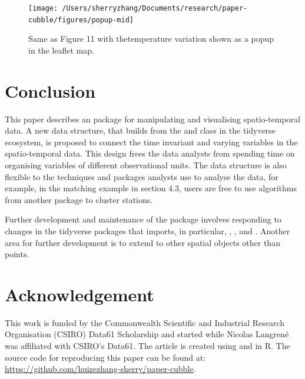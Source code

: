 \documentclass[
]{jss}
\begin{document}
\begin{CodeChunk}
\begin{figure}

{\centering \texttt{[image: /Users/sherryzhang/Documents/research/paper-cubble/figures/popup-mid]} 

}

\caption[Same as Figure 11 with thetemperature variation shown as a popup in the leaflet map]{Same as Figure 11 with thetemperature variation shown as a popup in the leaflet map.}\label{fig:interactive-popup}
\end{figure}
\end{CodeChunk}

\hypertarget{conclusion}{%
\section{Conclusion}\label{conclusion}}

This paper describes an  package  for
manipulating and visualising spatio-temporal data. A new data structure,
 that builds from the  and
 class in the tidyverse ecosystem, is proposed to
connect the time invariant and varying variables in the spatio-temporal
data. This design frees the data analysts from spending time on
organising variables of different observational units. The data
structure is also flexible to the techniques and packages analysts use
to analyse the data, for example, in the matching example in section
4.3, users are free to use algorithms from another package to cluster
stations.

Further development and maintenance of the package involves responding
to changes in the tidyverse packages that  imports, in
particular, , , and . Another area for
further development is to extend  to other spatial objects
other than points.

\hypertarget{acknowledgement}{%
\section{Acknowledgement}\label{acknowledgement}}

This work is funded by the Commonwealth Scientific and Industrial
Research Organisation (CSIRO) Data61 Scholarship and started while
Nicolas Langrené was affiliated with CSIRO's Data61. The article is
created using  \citep{knitr} and 
\citep{rmarkdown} in R. The source code for reproducing this paper can
be found at: \url{https://github.com/huizezhang-sherry/paper-cubble}.
\end{document}
